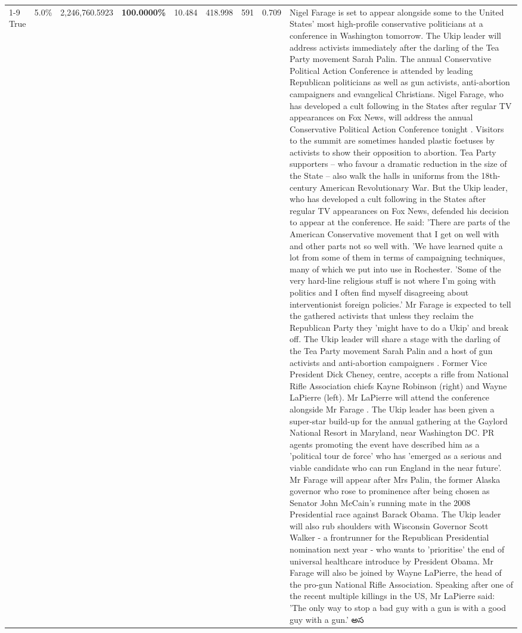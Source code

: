 \begin{table}[H]
\begin{tabular}{lllrlllll}
\cline{1-9}
True & 5.0\% & 2,246,760.5923 & \bfseries \color{red} 100.0000\% & 10.484 & 418.998 & 591 & 0.709 & Nigel Farage is set to appear alongside some to the United States' most high-profile conservative politicians at a conference in Washington tomorrow. The Ukip leader will address activists immediately after the darling of the Tea Party movement Sarah Palin. The annual Conservative Political Action Conference is attended by leading Republican politicians as well as gun activists, anti-abortion campaigners and evangelical Christians. Nigel Farage, who has developed a cult following in the States after regular TV appearances on Fox News, will address the annual Conservative Political Action Conference tonight . Visitors to the summit are sometimes handed plastic foetuses by activists to show their opposition to abortion. Tea Party supporters – who favour a dramatic reduction in the size of the State – also walk the halls in uniforms from the 18th-century American Revolutionary War. But the Ukip leader, who has developed a cult following in the States after regular TV appearances on Fox News, defended his decision to appear at the conference. He said: 'There are parts of the American Conservative movement that I get on well with and other parts not so well with. 'We have learned quite a lot from some of them in terms of campaigning techniques, many of which we put into use in Rochester. 'Some of the very hard-line religious stuff is not where I'm going with politics and I often find myself disagreeing about interventionist foreign policies.' Mr Farage is expected to tell the gathered activists that unless they reclaim the Republican Party they 'might have to do a Ukip' and break off. The Ukip leader will share a stage with the darling of the Tea Party movement Sarah Palin and a host of gun activists and anti-abortion campaigners . Former Vice President Dick Cheney, centre, accepts a rifle from National Rifle Association chiefs Kayne Robinson (right) and Wayne LaPierre (left). Mr LaPierre will attend the conference alongside Mr Farage . The Ukip leader has been given a super-star build-up for the annual gathering at the Gaylord National Resort in Maryland, near Washington DC. PR agents promoting the event have described him as a 'political tour de force' who has 'emerged as a serious and viable candidate who can run England in the near future'. Mr Farage will appear after Mrs Palin, the former Alaska governor who rose to prominence after being chosen as Senator John McCain's running mate in the 2008 Presidential race against Barack Obama. The Ukip leader will also rub shoulders with Wisconsin Governor Scott Walker - a frontrunner for the Republican Presidential nomination next year - who wants to 'prioritise' the end of universal healthcare introduce by President Obama. Mr Farage will also be joined by Wayne LaPierre, the head of the pro-gun National Rifle Association. Speaking after one of the recent multiple killings in the US, Mr LaPierre said: 'The only way to stop a bad guy with a gun is with a good guy with a gun.' అస \\

\end{tabular}
\end{table}
